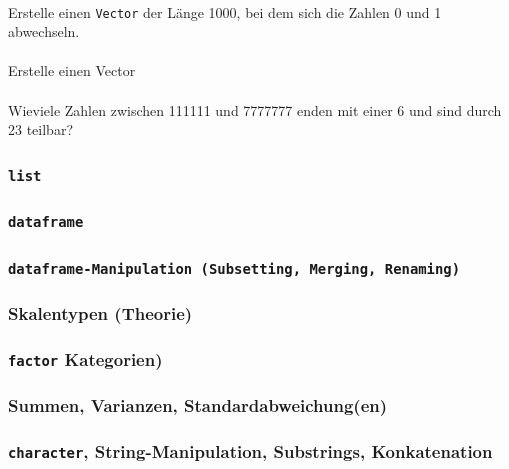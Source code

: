 \documentclass[paper=A4, pagesize, DIV=calc, smallheadings,
fontsize=11pt, expansion=false]{scrreprt}
\begin{document}
\paragraph{}
Erstelle einen \texttt{Vector} der Länge 1000, bei dem sich die Zahlen 0 und 1 abwechseln.

\paragraph{}
Erstelle einen Vector

\paragraph{}
Wieviele Zahlen zwischen 111111 und 7777777 enden mit einer 6 und sind durch 23 teilbar?


\subsubsection*{\texttt{\textbf{list}}}



\subsubsection*{\texttt{\textbf{dataframe}}}



\subsubsection*{\texttt{\textbf{dataframe}-Manipulation (Subsetting, Merging, Renaming)}}

\subsubsection*{Skalentypen (Theorie)}

\subsubsection*{\texttt{\textbf{factor}} Kategorien)}

\subsubsection*{Summen, Varianzen, Standardabweichung(en)}

\subsubsection*{\texttt{character}, String-Manipulation, Substrings, Konkatenation}
  
\end{document}
